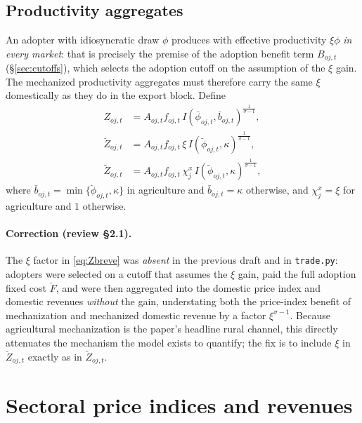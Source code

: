 \documentclass[11pt]{article}
\begin{document}
\subsection{Productivity aggregates}
An adopter with idiosyncratic draw $\phi$ produces with effective productivity
$\xi\phi$ \emph{in every market}: that is precisely the premise of the adoption benefit
term $B_{oj,t}$ (\S\ref{sec:cutoffs}), which selects the adoption cutoff on the assumption of the $\xi$
gain. The mechanized productivity aggregates must therefore carry the same $\xi$
domestically as they do in the export block. Define
\begin{align}
  Z_{oj,t} &= A_{oj,t} f_{oj,t}\, I(\bar\phi_{oj,t}, \bar b_{oj,t})^{\frac{1}{\sigma-1}}, \\
  \breve Z_{oj,t} &= A_{oj,t} f_{oj,t}\, \xi\, I(\breve\phi_{oj,t}, \kappa)^{\frac{1}{\sigma-1}},
  \label{eq:Zbreve}\\
  \tilde Z_{oj,t} &= A_{oj,t} f_{oj,t}\, \chi^x_j\, I(\tilde\phi_{oj,t}, \kappa)^{\frac{1}{\sigma-1}},
\end{align}
where $\bar b_{oj,t} = \min\{\breve\phi_{oj,t}, \kappa\}$ in agriculture and
$\bar b_{oj,t} = \kappa$ otherwise, and $\chi^x_j = \xi$ for agriculture and $1$ otherwise.

\paragraph{Correction (review \S2.1).} The $\xi$ factor in \eqref{eq:Zbreve} was
\emph{absent} in the previous draft and in \texttt{trade.py}: adopters were selected on a
cutoff that assumes the $\xi$ gain, paid the full adoption fixed cost $\breve F$, and were
then aggregated into the domestic price index and domestic revenues \emph{without} the
gain, understating both the price-index benefit of mechanization and mechanized domestic
revenue by a factor $\xi^{\sigma-1}$. Because agricultural mechanization is the paper's
headline rural channel, this directly attenuates the mechanism the model exists to
quantify; the fix is to include $\xi$ in $\breve Z_{oj,t}$ exactly as in $\tilde Z_{oj,t}$.

\section{Sectoral price indices and revenues}
\end{document}

